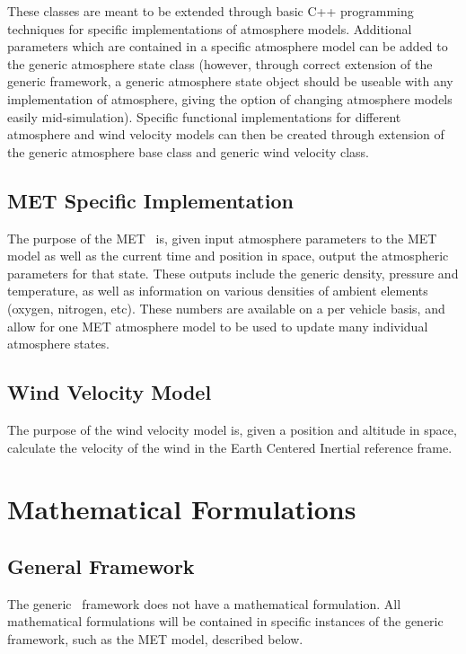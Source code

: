These classes are meant to be extended through basic C++ programming techniques
for specific implementations of atmosphere models. Additional parameters which
are contained in a specific atmosphere model can be added to the generic
atmosphere state class (however, through correct extension of the generic framework,
a generic atmosphere state object should be useable with any implementation of
atmosphere, giving the option of changing atmosphere models easily mid-simulation).
Specific functional implementations for different atmosphere and
wind velocity models can then be created through extension of the generic
atmosphere base class and generic wind velocity class.

\subsection{MET Specific Implementation}

The purpose of the MET \atmosphereDesc\ is, given input atmosphere parameters
to the MET model as well as the current time and position in space, output the
atmospheric parameters for that state. These outputs include the generic density,
pressure and temperature, as well as information on various densities of
ambient elements (oxygen, nitrogen, etc). These numbers are available on
a per vehicle basis, and allow for one MET atmosphere model to be used to update
many individual atmosphere states.

\subsection{Wind Velocity Model}

The purpose of the wind velocity model is, given a position and altitude
in space, calculate
the velocity of the wind in the Earth Centered Inertial reference frame.


\section{Mathematical Formulations}

\subsection{General Framework}

The generic \atmosphereDesc\ framework does not have a mathematical formulation.
All mathematical formulations will be contained in specific instances of the
generic framework, such as the MET model, described below.

